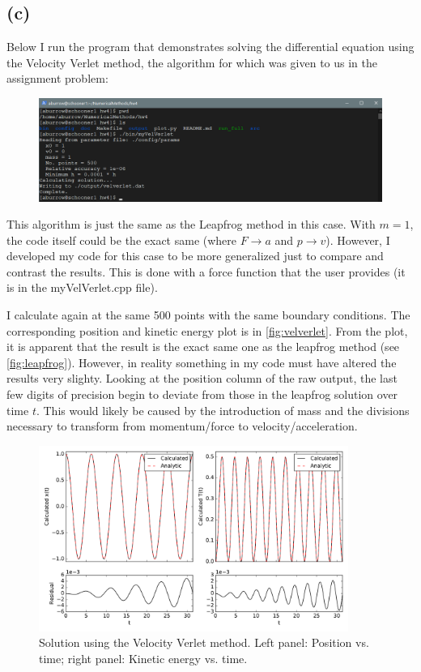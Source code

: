 \documentclass[12pt]{article}
\begin{document}
\subsection*{(c)}

Below I run the program that demonstrates solving the differential equation
using the Velocity Verlet method, the algorithm for which was given to us in
the assignment problem:
\begin{figure}[H]
    \centering
    \includegraphics[width=1\textwidth]{myVelVerlet}
    \label{fig:myVelVerlet}
\end{figure}

This algorithm is just the same as the Leapfrog method in this case. With $m=1$,
the code itself could be the exact same (where $F \rightarrow a$ and
$p \rightarrow v$). However, I developed my code for this case to be more
generalized just to compare and contrast the results. This is done with a
force function that the user provides (it is in the myVelVerlet.cpp file).

I calculate again at the same 500 points with the same boundary conditions. The
corresponding position and kinetic energy plot is in \autoref{fig:velverlet}.
From the plot, it is apparent that the result is the exact same one as the
leapfrog method (see \autoref{fig:leapfrog}). However, in reality something in
my code must have altered the results very slighty. Looking at the position
column of the raw output, the last few digits of precision begin to deviate
from those in the leapfrog solution over time $t$. This would likely be caused
by the introduction of mass and the divisions necessary to transform from
momentum/force to velocity/acceleration.

\begin{figure}[ht]
    \centering
    \includegraphics[width=0.9\textwidth]{velverlet}
    \caption{Solution using the Velocity Verlet method. Left panel: Position
             vs. time; right panel: Kinetic energy vs. time.}
    \label{fig:velverlet}
\end{figure}
\end{document}
